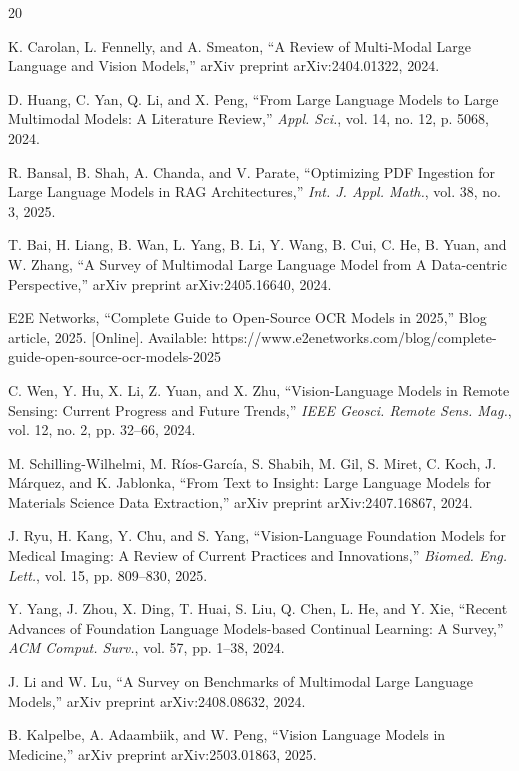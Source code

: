 \documentclass[conference]{IEEEtran}
\begin{document}
\begin{thebibliography}{20}

K. Carolan, L. Fennelly, and A. Smeaton, ``A Review of Multi-Modal Large Language and Vision Models,'' arXiv preprint arXiv:2404.01322, 2024.

D. Huang, C. Yan, Q. Li, and X. Peng, ``From Large Language Models to Large Multimodal Models: A Literature Review,'' \textit{Appl. Sci.}, vol. 14, no. 12, p. 5068, 2024.

R. Bansal, B. Shah, A. Chanda, and V. Parate, ``Optimizing PDF Ingestion for Large Language Models in RAG Architectures,'' \textit{Int. J. Appl. Math.}, vol. 38, no. 3, 2025.

T. Bai, H. Liang, B. Wan, L. Yang, B. Li, Y. Wang, B. Cui, C. He, B. Yuan, and W. Zhang, ``A Survey of Multimodal Large Language Model from A Data-centric Perspective,'' arXiv preprint arXiv:2405.16640, 2024.

E2E Networks, ``Complete Guide to Open-Source OCR Models in 2025,'' Blog article, 2025. [Online]. Available: https://www.e2enetworks.com/blog/complete-guide-open-source-ocr-models-2025

C. Wen, Y. Hu, X. Li, Z. Yuan, and X. Zhu, ``Vision-Language Models in Remote Sensing: Current Progress and Future Trends,'' \textit{IEEE Geosci. Remote Sens. Mag.}, vol. 12, no. 2, pp. 32--66, 2024.

M. Schilling-Wilhelmi, M. Ríos-García, S. Shabih, M. Gil, S. Miret, C. Koch, J. Márquez, and K. Jablonka, ``From Text to Insight: Large Language Models for Materials Science Data Extraction,'' arXiv preprint arXiv:2407.16867, 2024.

J. Ryu, H. Kang, Y. Chu, and S. Yang, ``Vision-Language Foundation Models for Medical Imaging: A Review of Current Practices and Innovations,'' \textit{Biomed. Eng. Lett.}, vol. 15, pp. 809--830, 2025.

Y. Yang, J. Zhou, X. Ding, T. Huai, S. Liu, Q. Chen, L. He, and Y. Xie, ``Recent Advances of Foundation Language Models-based Continual Learning: A Survey,'' \textit{ACM Comput. Surv.}, vol. 57, pp. 1--38, 2024.

J. Li and W. Lu, ``A Survey on Benchmarks of Multimodal Large Language Models,'' arXiv preprint arXiv:2408.08632, 2024.

B. Kalpelbe, A. Adaambiik, and W. Peng, ``Vision Language Models in Medicine,'' arXiv preprint arXiv:2503.01863, 2025.


\end{thebibliography}
\end{document}
